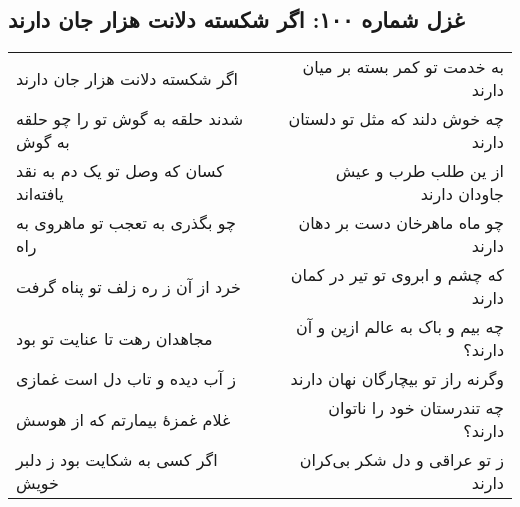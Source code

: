 \begin{center}
\section*{غزل شماره ۱۰۰: اگر شکسته دلانت هزار جان دارند}
\label{sec:100}
\begin{longtable}{l p{0.5cm} r}
اگر شکسته دلانت هزار جان دارند
&&
به خدمت تو کمر بسته بر میان دارند
\\
شدند حلقه به گوش تو را چو حلقه به گوش
&&
چه خوش دلند که مثل تو دلستان دارند
\\
کسان که وصل تو یک دم به نقد یافته‌اند
&&
از ین طلب طرب و عیش جاودان دارند
\\
چو بگذری به تعجب تو ماهروی به راه
&&
چو ماه ماهرخان دست بر دهان دارند
\\
خرد از آن ز ره زلف تو پناه گرفت
&&
که چشم و ابروی تو تیر در کمان دارند
\\
مجاهدان رهت تا عنایت تو بود
&&
چه بیم و باک به عالم ازین و آن دارند؟
\\
ز آب دیده و تاب دل است غمازی
&&
وگرنه راز تو بیچارگان نهان دارند
\\
غلام غمزهٔ بیمارتم که از هوسش
&&
چه تندرستان خود را ناتوان دارند؟
\\
اگر کسی به شکایت بود ز دلبر خویش
&&
ز تو عراقی و دل شکر بی‌کران دارند
\\
\end{longtable}
\end{center}
